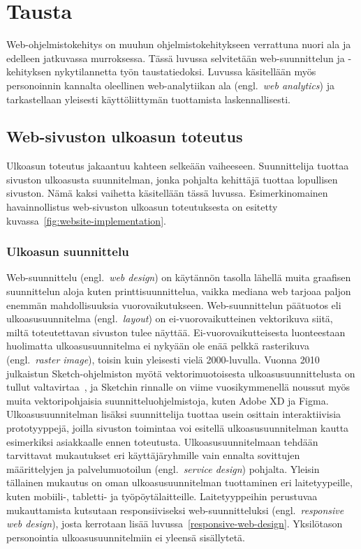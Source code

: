 \documentclass[finnish, 12pt, a4paper, elec, utf8, a-1b]{aaltothesis}
\begin{document}
\clearpage
\section{Tausta}\label{background}

Web-ohjelmistokehitys on muuhun ohjelmistokehitykseen verrattuna nuori ala ja
edelleen jatkuvassa murroksessa. Tässä luvussa selvitetään web-suunnittelun ja
-kehityksen nykytilannetta työn taustatiedoksi. Luvussa käsitellään myös
personoinnin kannalta oleellinen web-analytiikan ala (engl.~\textit{web
analytics}) ja tarkastellaan yleisesti käyttöliittymän tuottamista
laskennallisesti.

\subsection{Web-sivuston ulkoasun toteutus}

Ulkoasun toteutus jakaantuu kahteen selkeään vaiheeseen. Suunnittelija tuottaa
sivuston ulkoasusta suunnitelman, jonka pohjalta kehittäjä tuottaa lopullisen
sivuston. Nämä kaksi vaihetta käsitellään tässä luvussa. Esimerkinomainen
havainnollistus web-sivuston ulkoasun toteutuksesta on esitetty
kuvassa~\ref{fig:website-implementation}.

\subsubsection{Ulkoasun suunnittelu}\label{background-web-design}

Web-suunnittelu (engl.~\textit{web design}) on käytännön tasolla lähellä muita
graafisen suunnittelun aloja kuten printtisuunnittelua, vaikka mediana web
tarjoaa paljon enemmän mahdollisuuksia vuorovaikutukseen. Web-suunnittelun
päätuotos eli ulkoasusuunnitelma (engl.~\textit{layout}) on ei-vuorovaikutteinen
vektorikuva siitä, miltä toteutettavan sivuston tulee näyttää.
Ei-vuorovaikutteisesta luonteestaan huolimatta ulkoasusuunnitelma ei nykyään ole
enää pelkkä rasterikuva (engl.~\textit{raster image}), toisin kuin yleisesti
vielä 2000-luvulla. Vuonna 2010 julkaistun Sketch-ohjelmiston myötä
vektorimuotoisesta ulkoasusuunnittelusta on tullut
valtavirtaa~\cite{webdesignmuseum_2022}, ja Sketchin rinnalle on viime
vuosikymmenellä noussut myös muita vektoripohjaisia suunnitteluohjelmistoja,
kuten Adobe XD ja Figma. Ulkoasusuunnitelman lisäksi suunnittelija tuottaa usein
osittain interaktiivisia prototyyppejä, joilla sivuston toimintaa voi esitellä
ulkoasusuunnitelman kautta esimerkiksi asiakkaalle ennen toteutusta.
Ulkoasusuunnitelmaan tehdään tarvittavat mukautukset eri käyttäjäryhmille vain
ennalta sovittujen määrittelyjen ja palvelumuotoilun (engl.~\textit{service
design}) pohjalta. Yleisin tällainen mukautus on oman ulkoasusuunnitelman
tuottaminen eri laitetyypeille, kuten mobiili-, tabletti- ja työpöytälaitteille.
Laitetyyppeihin perustuvaa mukauttamista kutsutaan responsiiviseksi
web-suunnitteluksi (engl.~\textit{responsive web design}), josta kerrotaan lisää
luvussa~\ref{responsive-web-design}. Yksilötason personointia
ulkoasusuunnitelmiin ei yleensä sisällytetä.
\end{document}
